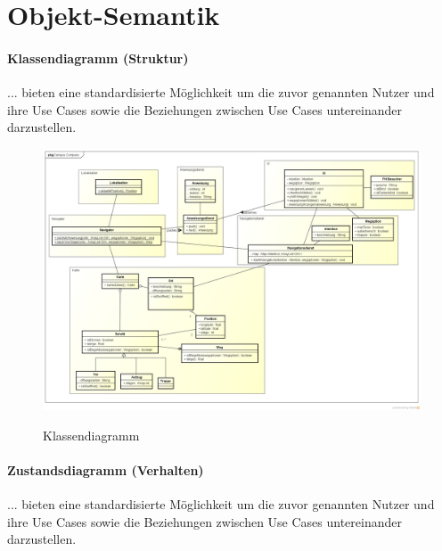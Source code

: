 \chapter{Objekt-Semantik}

\subsubsection*{Klassendiagramm (Struktur)}
... bieten eine standardisierte Möglichkeit um die zuvor genannten Nutzer und ihre Use Cases sowie die Beziehungen zwischen Use Cases untereinander darzustellen.

\begin{figure}[hbt]
  \centering
  \includegraphics[width=\linewidth]{img/klassendiagramm.png}
  \label{img:klassendiagramm}
  \caption{Klassendiagramm}
\end{figure}

\subsubsection*{Zustandsdiagramm (Verhalten)}
... bieten eine standardisierte Möglichkeit um die zuvor genannten Nutzer und ihre Use Cases sowie die Beziehungen zwischen Use Cases untereinander darzustellen.

